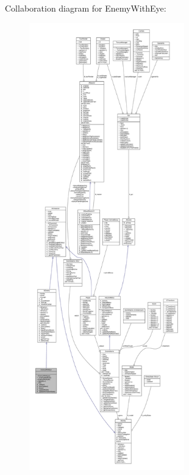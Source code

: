 Collaboration diagram for Enemy\+With\+Eye\+:
\nopagebreak
\begin{figure}[H]
\begin{center}
\leavevmode
\includegraphics[height=550pt]{class_enemy_with_eye__coll__graph}
\end{center}
\end{figure}
